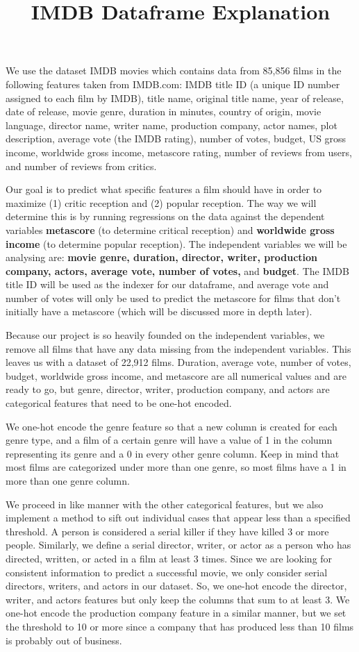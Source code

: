 \documentclass{article}
\title{IMDB Dataframe Explanation}
\begin{document}
\maketitle
We use the dataset IMDB movies which contains data from 85,856 films in the following features taken from IMDB.com: IMDB title ID (a unique ID number assigned to each film by IMDB), title name, original title name, year of release, date of release, movie genre, duration in minutes, country of origin, movie language, director name, writer name, production company, actor names, plot description, average vote (the IMDB rating), number of votes, budget, US gross income, worldwide gross income, metascore rating, number of reviews from users, and number of reviews from critics.

Our goal is to predict what specific features a film should have in order to maximize (1) critic reception and (2) popular reception. The way we will determine this is by running regressions on the data against the dependent variables \textbf{metascore} (to determine critical reception) and \textbf{worldwide gross income} (to determine popular reception). The independent variables we will be analysing are: \textbf{movie genre, duration, director, writer, production company, actors, average vote, number of votes,} and \textbf{budget}. The IMDB title ID will be used as the indexer for our dataframe, and average vote and number of votes will only be used to predict the metascore for films that don't initially have a metascore (which will be discussed more in depth later).

Because our project is so heavily founded on the independent variables, we remove all films that have any data missing from the independent variables. This leaves us with a dataset of 22,912 films. Duration, average vote, number of votes, budget, worldwide gross income, and metascore are all numerical values and are ready to go, but genre, director, writer, production company, and actors are categorical features that need to be one-hot encoded.

We one-hot encode the genre feature so that a new column is created for each genre type, and a film of a certain genre will have a value of 1 in the column representing its genre and a 0 in every other genre column. Keep in mind that most films are categorized under more than one genre, so most films have a 1 in more than one genre column.

We proceed in like manner with the other categorical features, but we also implement a method to sift out individual cases that appear less than a specified threshold. A person is considered a serial killer if they have killed 3 or more people. Similarly, we define a serial director, writer, or actor as a person who has directed, written, or acted in a film at least 3 times. Since we are looking for consistent information to predict a successful movie, we only consider serial directors, writers, and actors in our dataset. So, we one-hot encode the director, writer, and actors features but only keep the columns that sum to at least 3. We one-hot encode the production company feature in a similar manner, but we set the threshold to 10 or more since a company that has produced less than 10 films is probably out of business.
\end{document}
